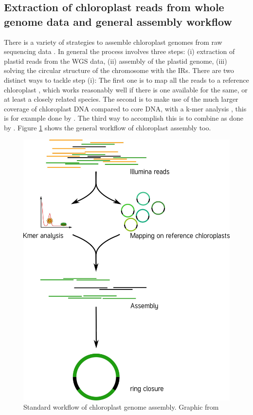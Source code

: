 \subsection{Extraction of chloroplast reads from whole genome data and general assembly workflow}
There is a variety of strategies to assemble chloroplast genomes from raw sequencing data \cite{twyford_strategies_2017}. In general the process involves three steps: (i) extraction of plastid reads from the WGS data, (ii) assembly of the plastid genome, (iii) solving the circular structure of the chromosome with the IRs. There are two distinct ways to tackle step (i): The first one is to map all the reads to a reference chloroplast \cite{Vinga2012}, which works reasonably well if there is one available for the same, or at least a closely related species. The second is to make use of the much larger coverage of chloroplast DNA compared to core DNA, with a k-mer analysis \cite{Chan2013}, this is for example done by \ce \cite{j_ankenbrand_chloroextractor:_2018}. The third way to accomplish this is to combine as done by \np  \cite{dierckxsens_novoplasty:_2017}.
Figure \ref{fig:cpast_workflow} shows the general workflow of chloroplast assembly too. 


\begin{figure}[H]
\centering
\includegraphics[height=.65\textheight, width=.95\textwidth]{Figures/CE_workflow}
\decoRule
\caption[Chloroplast genome assembly workflow]{Standard workflow of chloroplast genome assembly. Graphic from \cite{j_ankenbrand_chloroextractor:_2018} }
\label{fig:cpast_workflow}
\end{figure}


